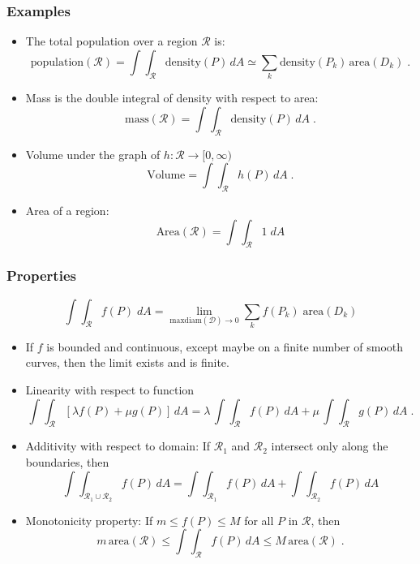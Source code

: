  \begin{frame}
 \frametitle{Examples}

\begin{itemize}
  \item \pause The total population over a region $\mathcal{R}$ is:
%
$$\text{population}(\mathcal{R}) = \int\!\!\!\int_{\mathcal{R}} \text{density}(P) \, dA \simeq \sum_k \text{density}(P_k) \, \text{area}(D_k) \; .$$

  \item \pause Mass is the double integral of density with respect to area:
  $$\text{mass}(\mathcal{R}) = \int\!\!\!\int_{\mathcal{R}} \text{density}(P) \, dA\; .$$

    \item \pause Volume under the graph of $h\colon \mathcal{R} \to [0,\infty)$
%
$$\text{Volume} = \int\!\!\!\int_{\mathcal{R}} h(P) \, dA \; .$$

    \item \pause Area of a region:
    $$\text{Area}(\mathcal{R}) = \int\!\!\!\int_{\mathcal{R}} 1 \; dA$$
\end{itemize}
\end{frame}

\begin{frame}
  \frametitle{Properties}
    $$\int\!\!\int_{\mathcal{R}} f(P) \; dA = \lim_{\text{maxdiam}(\mathcal{D}) \to 0} \sum_k f(P_k) \; \text{area}(D_k)$$
%

 \begin{itemize}
    \item \pause If $f$ is bounded and continuous, except maybe on a finite number of smooth curves,
  then the limit exists and is finite.

  \item \pause Linearity with respect to function
  $$\int\!\!\!\int_{\mathcal{R}} [\lambda f(P) +\mu g(P)] \, dA = \lambda \, \int\!\!\!\int_{\mathcal{R}} f(P) \, dA +\mu \, \int\!\!\!\int_{\mathcal{R}} g(P) \, dA \; .$$
  \item \pause Additivity with respect to domain: If $\mathcal{R}_1$ and $\mathcal{R}_2$ intersect only along the boundaries, then
      $$\int\!\!\!\int_{\mathcal{R}_1\cup \mathcal{R}_2} f(P)\, dA = \int\!\!\!\int_{\mathcal{R}_1} f(P)\, dA + \int\!\!\!\int_{\mathcal{R}_2} f(P)\, dA $$
  \item \pause Monotonicity property: If $m \leqslant f(P) \leqslant M$ for all $P$ in $\mathcal{R}$, then
      $$m \, \text{area}(\mathcal{R}) \leqslant \int\!\!\!\int_{\mathcal{R}} f(P)\, dA \leqslant M \, \text{area} (\mathcal{R})\; .$$
\end{itemize}
\end{frame}

